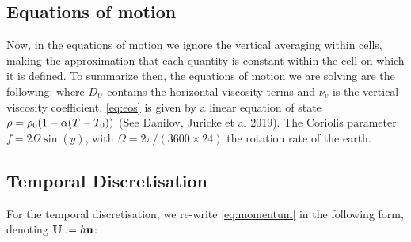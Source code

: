 \documentclass[10pt]{article}
\begin{document}
\subsection{Equations of motion}
Now, in the equations of motion we ignore the vertical averaging within cells, making the approximation that each quantity is constant within the cell on which it is defined. To summarize then, the equations of motion we are solving are the following:
where $D_{U}$ contains the horizontal viscosity terms and $\nu_{v}$ is the vertical viscosity coefficient. \cref{eq:eos} is given by a linear equation of state $\rho = \rho_{0}(1 - \alpha(T-T_{0}))$ (See Danilov, Juricke et al 2019). The Coriolis parameter $f = 2\Omega\sin(y)$, with $\Omega =2\pi/(3600\times 24)$ the rotation rate of the earth.
\subsection{Temporal Discretisation}
For the temporal discretisation, we re-write \cref{eq:momentum} in the following form, denoting $\mathbf{U} : = h\mathbf{u}$:
\end{document}
